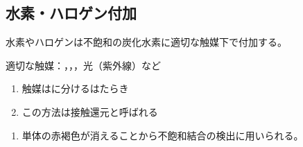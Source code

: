 \subsection{水素・ハロゲン付加}
\begin{screen}
  \centerline{
    水素やハロゲンは不飽和の炭化水素に適切な触媒下で付加する。
  }
\end{screen}
適切な触媒：，，，光（紫外線）など


\begin{enumerate}[label=\cdot]
  \item 触媒はに分けるはたらき
  \item この方法は接触還元と呼ばれる
\end{enumerate}


\begin{enumerate}[label=\cdot]
  \item {}単体の赤褐色が消えることから不飽和結合の検出に用いられる。
\end{enumerate}
